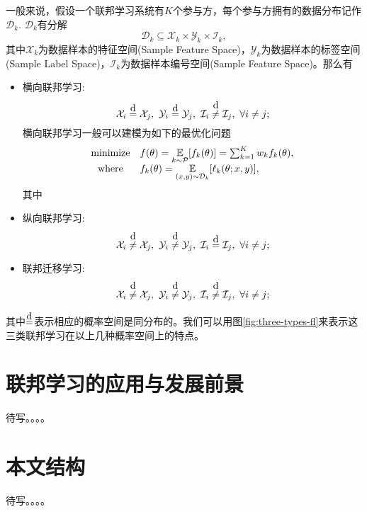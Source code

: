 一般来说，假设一个联邦学习系统有$K$个参与方，每个参与方拥有的数据分布记作$\mathcal{D}_k.$ $\mathcal{D}_k$有分解
\begin{equation*}
\mathcal{D}_k \subseteq \mathcal{X}_k \times \mathcal{Y}_k \times \mathcal{I}_k,
\end{equation*}
其中$\mathcal{X}_k$为数据样本的特征空间(Sample Feature Space)，$\mathcal{Y}_k$为数据样本的标签空间(Sample Label Space)，$\mathcal{I}_k$为数据样本编号空间(Sample Feature Space)。那么有\cite{Yang_2019_VFL,vfl}
\begin{itemize}
\item 横向联邦学习:
\begin{equation*}
\mathcal{X}_i \eqabove{d} \mathcal{X}_j, ~ \mathcal{Y}_i \eqabove{d} \mathcal{Y}_j, ~ \mathcal{I}_i \neqabove{d} \mathcal{I}_j, ~ \forall i \neq j;
\end{equation*}
横向联邦学习一般可以建模为如下的最优化问题
\begin{equation}
\label{eq:general-hfl}
\begin{array}{cl}
\text{minimize} & f(\theta) = \operatorname*{\mathbb{E}}\limits_{k \sim {\mathcal{P}}} [f_k(\theta)] = \sum_{k=1}^K w_k f_k(\theta), \\
\text{where} & f_k(\theta) = \operatorname*{\mathbb{E}}\limits_{(x, y) \sim \mathcal{D}_k} [\ell_k(\theta; x, y)],
\end{array}
\end{equation}
其中
\item 纵向联邦学习:
\begin{equation*}
\mathcal{X}_i \neqabove{d} \mathcal{X}_j, ~ \mathcal{Y}_i \neqabove{d} \mathcal{Y}_j, ~ \mathcal{I}_i \eqabove{d} \mathcal{I}_j, ~ \forall i \neq j;
\end{equation*}
\item 联邦迁移学习:
\begin{equation*}
\mathcal{X}_i \neqabove{d} \mathcal{X}_j, ~ \mathcal{Y}_i \neqabove{d} \mathcal{Y}_j, ~ \mathcal{I}_i \neqabove{d} \mathcal{I}_j, ~ \forall i \neq j;
\end{equation*}
\end{itemize}
其中$\eqabove{d}$表示相应的概率空间是同分布的。我们可以用图\ref{fig:three-types-fl}来表示这三类联邦学习在以上几种概率空间上的特点。





\section{联邦学习的应用与发展前景}
\label{sec:fl_application}

待写。。。。


\section{本文结构}
\label{sec:structure}

待写。。。。
